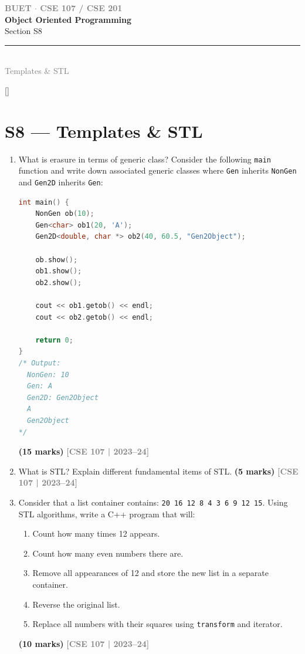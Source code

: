 \documentclass[12pt,a3paper]{article}
\newcommand{\yr}[1]{\hfill\textcolor{gray}{\small\textbf{[#1]}}}
\newcommand{\mk}[1]{\textcolor{orange!70!black}{\small\textbf{(#1 marks)}}}
\newcommand{\secdivider}[4]{%
  \newpage\thispagestyle{empty}%
  \vspace*{\fill}%
  \begin{tcolorbox}[enhanced,colback=#4!7,colframe=#3,boxrule=1.5pt,arc=8pt,
    left=20pt,right=20pt,top=22pt,bottom=22pt,
    shadow={3pt}{-3pt}{0pt}{black!15}]
    \centering
    {\large\textcolor{gray}{\textbf{BUET $\cdot$ CSE 107 / CSE 201}}}\\[8pt]
    {\fontsize{26}{32}\selectfont\bfseries\textcolor{#3}{Object Oriented Programming}}\\[6pt]
    {\fontsize{15}{19}\selectfont\textcolor{dgray}{#1}}\\[12pt]
    \textcolor{#3!60}{\rule{0.5\textwidth}{0.5pt}}\\[6pt]
    {\small\textcolor{gray}{#2}}
  \end{tcolorbox}%
  \vspace*{\fill}\newpage%
}
\begin{document}
\newpage

\secdivider{Section S8}{Templates \& STL}{cH}{cH}
\label{sec:S8}
\titleformat{\section}{\large\bfseries\color{cH}}{}{0em}{}[\titlerule]
\section{S8 --- Templates \& STL}

\begin{enumerate}


\item What is erasure in terms of generic class? Consider the following \texttt{main} function and write down associated generic classes where \texttt{Gen} inherits \texttt{NonGen} and \texttt{Gen2D} inherits \texttt{Gen}:
\begin{lstlisting}[language=C++]
int main() {
    NonGen ob(10);
    Gen<char> ob1(20, 'A');
    Gen2D<double, char *> ob2(40, 60.5, "Gen2Object");
    
    ob.show(); 
    ob1.show(); 
    ob2.show();
    
    cout << ob1.getob() << endl;
    cout << ob2.getob() << endl;
    
    return 0;
}
/* Output: 
  NonGen: 10 
  Gen: A  
  Gen2D: Gen2Object 
  A 
  Gen2Object
*/
\end{lstlisting}
\mk{15}
\yr{CSE 107 | 2023--24}




\item What is STL? Explain different fundamental items of STL. \mk{5}
\yr{CSE 107 | 2023--24}





\item Consider that a list container contains: \texttt{20 16 12 8 4 3 6 9 12 15}. Using STL algorithms, write a C++ program that will:
\begin{enumerate}
  \item Count how many times 12 appears.
  \item Count how many even numbers there are.
  \item Remove all appearances of 12 and store the new list in a separate container.
  \item Reverse the original list.
  \item Replace all numbers with their squares using \texttt{transform} and iterator.
\end{enumerate}
\mk{10}
\yr{CSE 107 | 2023--24}





\end{enumerate}
\end{document}
